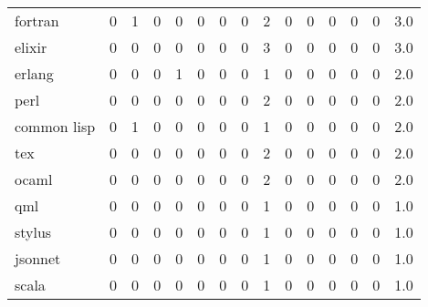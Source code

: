 \begin{tabular}{lrrrrrrrrrrrrrr}
fortran          &        0 &       1 &          0 &               0 &                0 &       0 &          0 &          2 &         0 &         0 &      0 &             0 &         0 &      3.0 \\
elixir           &        0 &       0 &          0 &               0 &                0 &       0 &          0 &          3 &         0 &         0 &      0 &             0 &         0 &      3.0 \\
erlang           &        0 &       0 &          0 &               1 &                0 &       0 &          0 &          1 &         0 &         0 &      0 &             0 &         0 &      2.0 \\
perl             &        0 &       0 &          0 &               0 &                0 &       0 &          0 &          2 &         0 &         0 &      0 &             0 &         0 &      2.0 \\
common lisp      &        0 &       1 &          0 &               0 &                0 &       0 &          0 &          1 &         0 &         0 &      0 &             0 &         0 &      2.0 \\
tex              &        0 &       0 &          0 &               0 &                0 &       0 &          0 &          2 &         0 &         0 &      0 &             0 &         0 &      2.0 \\
ocaml            &        0 &       0 &          0 &               0 &                0 &       0 &          0 &          2 &         0 &         0 &      0 &             0 &         0 &      2.0 \\
qml              &        0 &       0 &          0 &               0 &                0 &       0 &          0 &          1 &         0 &         0 &      0 &             0 &         0 &      1.0 \\
stylus           &        0 &       0 &          0 &               0 &                0 &       0 &          0 &          1 &         0 &         0 &      0 &             0 &         0 &      1.0 \\
jsonnet          &        0 &       0 &          0 &               0 &                0 &       0 &          0 &          1 &         0 &         0 &      0 &             0 &         0 &      1.0 \\
scala            &        0 &       0 &          0 &               0 &                0 &       0 &          0 &          1 &         0 &         0 &      0 &             0 &         0 &      1.0 \\

\end{tabular}
